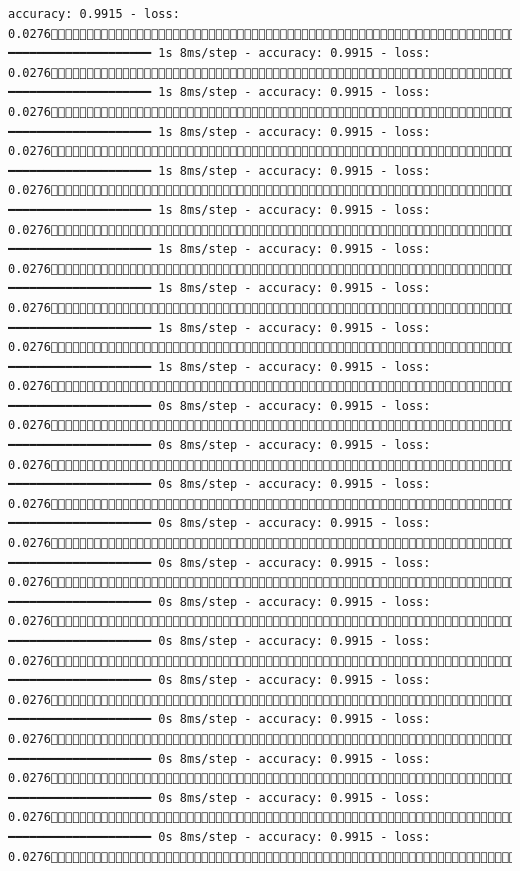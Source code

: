 \documentclass[
  letterpaper,
  DIV=11,
  numbers=noendperiod]{scrreprt}
\begin{document}
\begin{verbatim}
accuracy: 0.9915 - loss: 0.02761680/1875 ━━━━━━━━━━━━━━━━━━━━ 1s 8ms/step - accuracy: 0.9915 - loss: 0.02761687/1875 ━━━━━━━━━━━━━━━━━━━━ 1s 8ms/step - accuracy: 0.9915 - loss: 0.02761695/1875 ━━━━━━━━━━━━━━━━━━━━ 1s 8ms/step - accuracy: 0.9915 - loss: 0.02761703/1875 ━━━━━━━━━━━━━━━━━━━━ 1s 8ms/step - accuracy: 0.9915 - loss: 0.02761710/1875 ━━━━━━━━━━━━━━━━━━━━ 1s 8ms/step - accuracy: 0.9915 - loss: 0.02761717/1875 ━━━━━━━━━━━━━━━━━━━━ 1s 8ms/step - accuracy: 0.9915 - loss: 0.02761725/1875 ━━━━━━━━━━━━━━━━━━━━ 1s 8ms/step - accuracy: 0.9915 - loss: 0.02761732/1875 ━━━━━━━━━━━━━━━━━━━━ 1s 8ms/step - accuracy: 0.9915 - loss: 0.02761739/1875 ━━━━━━━━━━━━━━━━━━━━ 1s 8ms/step - accuracy: 0.9915 - loss: 0.02761745/1875 ━━━━━━━━━━━━━━━━━━━━ 0s 8ms/step - accuracy: 0.9915 - loss: 0.02761751/1875 ━━━━━━━━━━━━━━━━━━━━ 0s 8ms/step - accuracy: 0.9915 - loss: 0.02761757/1875 ━━━━━━━━━━━━━━━━━━━━ 0s 8ms/step - accuracy: 0.9915 - loss: 0.02761763/1875 ━━━━━━━━━━━━━━━━━━━━ 0s 8ms/step - accuracy: 0.9915 - loss: 0.02761769/1875 ━━━━━━━━━━━━━━━━━━━━ 0s 8ms/step - accuracy: 0.9915 - loss: 0.02761776/1875 ━━━━━━━━━━━━━━━━━━━━ 0s 8ms/step - accuracy: 0.9915 - loss: 0.02761782/1875 ━━━━━━━━━━━━━━━━━━━━ 0s 8ms/step - accuracy: 0.9915 - loss: 0.02761788/1875 ━━━━━━━━━━━━━━━━━━━━ 0s 8ms/step - accuracy: 0.9915 - loss: 0.02761794/1875 ━━━━━━━━━━━━━━━━━━━━ 0s 8ms/step - accuracy: 0.9915 - loss: 0.02761800/1875 ━━━━━━━━━━━━━━━━━━━━ 0s 8ms/step - accuracy: 0.9915 - loss: 0.02761808/1875 ━━━━━━━━━━━━━━━━━━━━ 0s 8ms/step - accuracy: 0.9915 - loss: 0.02761815/1875 ━━━━━━━━━━━━━━━━━━━━ 0s 8ms/step - accuracy: 0.9915 - loss: 0.02761823/1875 
\end{verbatim}
\end{document}
